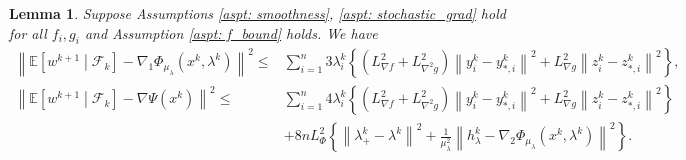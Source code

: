 \documentclass[10pt]{article}
\newtheorem{lemma}{Lemma}[section]
\theoremstyle{remark}
\def\setF{\mathscr{F}} %
\newcommand{\E}{\mathbb{E}}
\newcommand{\norm}[1]{\left\|#1\right\|}
\begin{document}
\begin{lemma}\label{lem: hypergrad_error}
    Suppose Assumptions \ref{aspt: smoothness}, \ref{aspt: stochastic_grad} hold for all $f_i, g_i$ and Assumption \ref{aspt: f_bound} holds. We have
    \begin{align*}
        \norm{\E\left[w^{k+1}\middle|\setF_k\right] - \nabla_1\Phi_{\mu_{\lambda}}(x^k, \lambda^k)}^2\leq &\sum_{i=1}^{n}3\lambda_i^k \left\{\left(L_{\nabla f}^2 + L_{\nabla^2 g}^2\right)\norm{y_i^k - y_{*,i}^k}^2 + L_{\nabla g}^2\norm{z_i^k - z_{*,i}^k}^2\right\}, \\
        \norm{\E\left[w^{k+1}\middle|\setF_k\right] - \nabla\Psi(x^k)}^2 \leq &\sum_{i=1}^{n}4\lambda_i^k \left\{\left(L_{\nabla f}^2 + L_{\nabla^2 g}^2\right)\norm{y_i^k - y_{*,i}^k}^2 + L_{\nabla g}^2\norm{z_i^k - z_{*,i}^k}^2\right\} \\
        & + 8nL_{\Phi}^2\left\{\norm{\lambda_+^k - \lambda^k}^2 + \frac{1}{\mu_{\lambda}^2}\norm{h_{\lambda}^k - \nabla_2\Phi_{\mu_{\lambda}}(x^k, \lambda^k)}^2\right\}.
    \end{align*}
\end{lemma}
\end{document}

